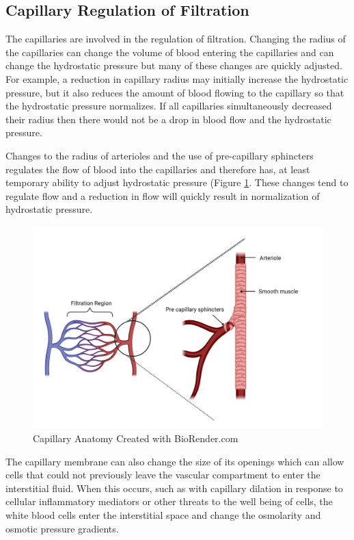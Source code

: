 \subsection{Capillary Regulation of Filtration}

The capillaries are involved in the regulation of filtration. Changing the radius of the capillaries can change the volume of blood entering the capillaries and can change the hydrostatic pressure but many of these changes are quickly adjusted. For example, a reduction in capillary radius may initially increase the hydrostatic pressure, but it also reduces the amount of blood flowing to the capillary so that the hydrostatic pressure normalizes. If all capillaries simultaneously decreased their radius then there would not be a drop in blood flow and the hydrostatic pressure. 

Changes to the radius of arterioles and the use of pre-capillary sphincters regulates the flow of blood into the capillaries and therefore has, at least temporary ability to adjust hydrostatic pressure (Figure \ref{fig:capillaries}. These changes tend to regulate flow and a reduction in flow will quickly result in normalization of hydrostatic pressure.

\begin{figure}[!h]
    \centering
    \includegraphics[width=1\linewidth]{./figure/capillaries.png}
    \caption{Capillary Anatomy \footnotesize{Created with BioRender.com}}
    \label{fig:capillaries}
\end{figure}


The capillary membrane can also change the size of its openings which can allow cells that could not previously leave the vascular compartment to enter the interstitial fluid. When this occurs, such as with capillary dilation in response to cellular inflammatory mediators or other threats to the well being of cells, the white blood cells enter the interstitial space and change the osmolarity and osmotic pressure gradients. 

